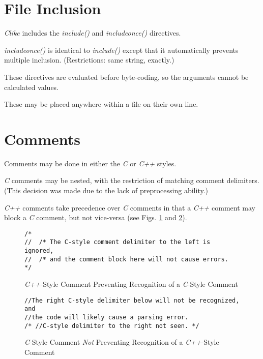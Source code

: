 \section{File Inclusion}
\label{ccik2:ssff0}

\emph{Clike} includes the \emph{include()} and \emph{includeonce()} directives.

\emph{includeonce()} is identical to \emph{include()} except that it automatically
prevents multiple inclusion.  (Restrictions:  same string, exactly.)

These directives are evaluated before byte-coding, so the arguments cannot be calculated
values.

These may be placed anywhere within a file on their own line. 


\section{Comments}
\label{ccik2:scom0}

Comments may be done in either the \emph{C} or \emph{C++} styles.

\emph{C} comments may be nested, with the restriction of matching comment delimiters.  (This
decision was made due to the lack of preprocessing ability.)

\emph{C++} comments take precedence over \emph{C} comments in that a \emph{C++} comment
may block a \emph{C} comment, but not vice-versa (see Figs. \ref{fig:ccik2:scom0:01}
and \ref{fig:ccik2:scom0:02}).

\begin{figure}
\begin{verbatim}
/*
//  /* The C-style comment delimiter to the left is ignored,
//  /* and the comment block here will not cause errors.
*/
\end{verbatim}
\caption{\emph{C++}-Style Comment Preventing Recognition of a \emph{C}-Style Comment}
\label{fig:ccik2:scom0:01}
\end{figure}

\begin{figure}
\begin{verbatim}
//The right C-style delimiter below will not be recognized, and
//the code will likely cause a parsing error.
/* //C-style delimiter to the right not seen. */
\end{verbatim}
\caption{\emph{C}-Style Comment \emph{Not} Preventing Recognition of a \emph{C++}-Style Comment}
\label{fig:ccik2:scom0:02}
\end{figure}


